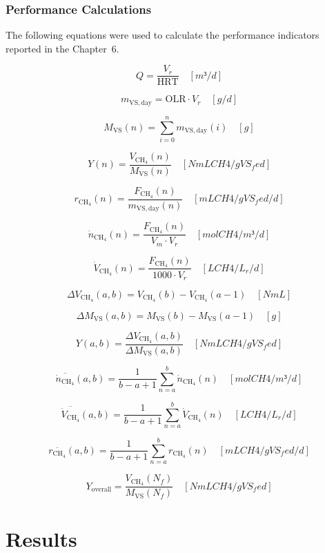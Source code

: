 \documentclass[12pt, a4paper, oneside]{report}
\begin{document}
    

\endgroup

\subsection{Performance Calculations}

The following equations were used to calculate the performance indicators reported in the Chapter 6.

\[
    Q = \frac{V_r}{\mathrm{HRT}} \quad \left[m³/d\right]
\]

\[
    m_{\mathrm{VS,day}} = \mathrm{OLR} · V_r \quad \left[g /d\right]
\]

\[
    M_{\mathrm{VS}}(n) = \sum_{i=0}^{n} m_{\mathrm{VS,day}}(i) \quad \left[g\right]
\]

\[
    Y(n) = \frac{V_{\mathrm{CH_4}}(n)}{M_{\mathrm{VS}}(n)} \quad \left[Nm L CH4 /g VS_fed\right]
\]

\[
    r_{\mathrm{CH_4}}(n) = \frac{F_{\mathrm{CH_4}}(n)}{m_{\mathrm{VS,day}}(n)} \quad \left[m L CH4 /g VS_fed /d\right]
\]

\[
    \dot{n}_{\mathrm{CH_4}}(n) = \frac{F_{\mathrm{CH_4}}(n)}{V_m · V_r} \quad \left[mol CH4 /m³/d\right]
\]

\[
    \dot{V}_{\mathrm{CH_4}}(n) = \frac{F_{\mathrm{CH_4}}(n)}{1000 · V_r} \quad \left[L CH4 /L_r /d\right]
\]

\[
    \Delta V_{\mathrm{CH_4}}(a,b) = V_{\mathrm{CH_4}}(b) - V_{\mathrm{CH_4}}(a-1) \quad \left[Nm L\right]
\]

\[
    \Delta M_{\mathrm{VS}}(a,b) = M_{\mathrm{VS}}(b) - M_{\mathrm{VS}}(a-1) \quad \left[g\right]
\]

\[
    Y(a,b) = \frac{\Delta V_{\mathrm{CH_4}}(a,b)}{\Delta M_{\mathrm{VS}}(a,b)} \quad \left[Nm L CH4 /g VS_fed\right]
\]

\[
    \overline{\dot{n}_{\mathrm{CH_4}}}(a,b) = \frac{1}{b - a + 1} \sum_{n=a}^{b} \dot{n}_{\mathrm{CH_4}}(n) \quad \left[mol CH4 /m³/d\right]
\]

\[
    \overline{\dot{V}_{\mathrm{CH_4}}}(a,b) = \frac{1}{b - a + 1} \sum_{n=a}^{b} \dot{V}_{\mathrm{CH_4}}(n) \quad \left[L CH4 /L_r /d\right]
\]

\[
    \overline{r_{\mathrm{CH_4}}}(a,b) = \frac{1}{b - a + 1} \sum_{n=a}^{b} r_{\mathrm{CH_4}}(n) \quad \left[m L CH4 /g VS_fed /d\right]
\]

\[
    Y_{\text{overall}} = \frac{V_{\mathrm{CH_4}}(N_f)}{M_{\mathrm{VS}}(N_f)} \quad \left[Nm L CH4 /g VS_fed\right]
\]
\clearpage{}
\clearpage{}\chapter{Results}
\end{document}
